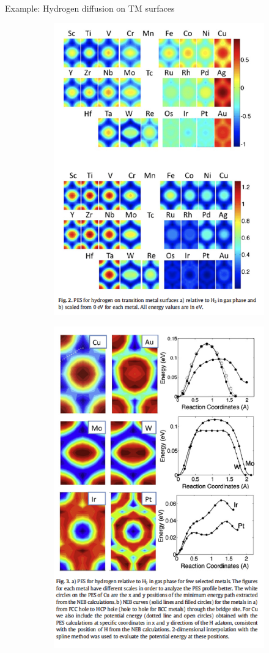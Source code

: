 \documentclass[aspectratio=169]{beamer}
\begin{document}
    \begin{frame}{Example: Hydrogen diffusion on TM surfaces}
        \begin{figure}
            \centering
            \begin{subfigure}{0.45\textwidth}
                \centering
                \includegraphics[width=0.65\linewidth]{lectures/figures/12-H_TM_1.png}
            \end{subfigure}
            \begin{subfigure}{0.45\textwidth}
                \centering
                \includegraphics[width=0.6\linewidth]{lectures/figures/12-H_TM_2.png}
            \end{subfigure}
            \caption{\cite{kristinsdottirSystematicDFTStudy2012}}
        \end{figure}
    \end{frame}
\end{document}
